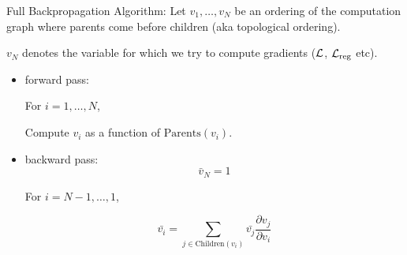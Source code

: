 \documentclass[handout,aspectratio=169]{beamer}
\begin{document}
\begin{frame}{Full Backpropagation Algorithm:}
  Let $v_1, \ldots, v_N$ be an ordering of the computation graph  where parents come before children (aka topological ordering). 


  $v_N$ denotes the variable for which we try to compute gradients (${\cal L}$, ${\cal L}_{\rm reg}$ etc).

  \begin{itemize}
  \item 
    forward pass:

    \begin{center}
      For $i = 1, \dots, N$, 

      Compute $v_i$ as a function of $\text{Parents}(v_i)$.
    \end{center}

  \item 
    backward pass:
$$\bar v_N=1$$
    \begin{center}
      For $i = N-1, \dots, 1$,
    \end{center}
    $$\bar{v_i} = \sum_{j \in \text{Children}(v_i)} \bar{v_j} \frac{\partial v_j}{\partial v_i}$$
  \end{itemize}
\end{frame}

\end{document}
